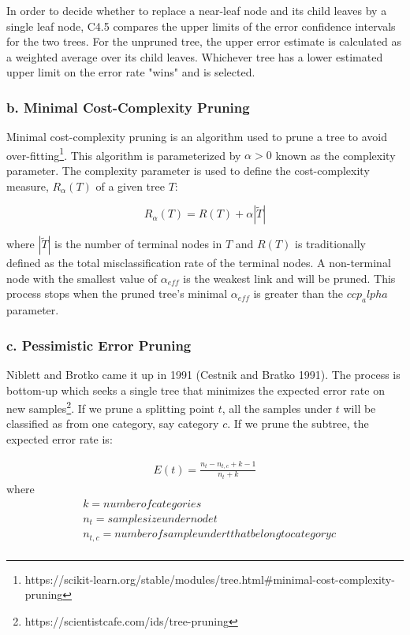 \documentclass[UTF8]{ctexart}
\begin{document}
In order to decide whether to replace a near-leaf node and its child leaves by a single leaf node, C4.5 compares the upper limits of the error confidence intervals for the two trees. For the unpruned tree, the upper error estimate is calculated as a weighted average over its child leaves. Whichever tree has a lower estimated upper limit on the error rate "wins" and is selected.

\subsubsection*{b. Minimal Cost-Complexity Pruning}

Minimal cost-complexity pruning is an algorithm used to prune a tree to avoid over-fitting\footnote{https://scikit-learn.org/stable/modules/tree.html\#minimal-cost-complexity-pruning}. This algorithm is parameterized by $\alpha > 0$ known as the complexity parameter. The complexity parameter is used to define the cost-complexity measure, $R_\alpha (T)$ of a given tree $T$:

\begin{equation}
	R_\alpha(T) = R(T) + \alpha |\tilde{T}|
\end{equation}

where $|\tilde{T}|$ is the number of terminal nodes in $T$ and $R(T)$ is traditionally defined as the total misclassification rate of the terminal nodes. A non-terminal node with the smallest value of $\alpha_{eff}$ is the weakest link and will be pruned. This process stops when the pruned tree's minimal $\alpha_{eff}$ is greater than the $ccp_alpha$ parameter.

\subsubsection*{c. Pessimistic Error Pruning}

Niblett and Brotko came it up in 1991 (Cestnik and Bratko 1991). The process is bottom-up which seeks a single tree that minimizes the expected error rate on new samples\footnote{https://scientistcafe.com/ids/tree-pruning}. If we prune a splitting point $t$, all the samples under $t$ will be classified as from one category, say category $c$. If we prune the subtree, the expected error rate is:

\begin{equation}
	\begin{aligned}
		E(t) = \frac{n_t - n_{t,c} + k - 1}{n_t + k}
	\end{aligned}
\end{equation}
where
\begin{equation}\nonumber
	\begin{aligned}
		 & k       = number of categories                               \\
		 & n_t     = sample size under node t                           \\
		 & n_{t,c} = number of sample under t that belong to category c \\
	\end{aligned}
\end{equation}
\end{document}
